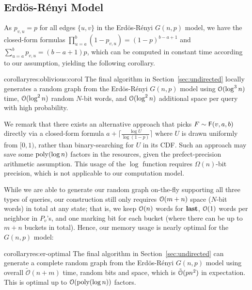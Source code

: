 \subsection{Erd\"{o}s-R\'{e}nyi Model}
\label{sec:app_er}
As $p_{v,u} = p$ for all edges $\{u,v\}$ in the Erd\"{o}s-R\'{e}nyi $G(n,p)$ model, we have the closed-form formulas $\prod_{u=a}^b (1-p_{v,u}) = (1-p)^{b-a+1}$ and $\sum_{u=a}^b p_{v,u} = (b-a+1)p$, which can be computed in constant time according to our assumption, yielding the following corollary.
\begin{restatable}{corollary}{res:oblivious:corol}
The final algorithm in Section~\ref{sec:undirected} locally generates a random graph from the Erd\"{o}s-R\'{e}nyi $G(n,p)$ model using $\mathcal{O}(\log^3 n)$ time, $\mathcal{O}(\log^2 n)$ random $N$-bit words, and $\mathcal{O}(\log^2 n)$ additional space per query with high probability.
\end{restatable}

We remark that there exists an alternative approach that picks $F\sim\mathsf{F}(v,a,b)$ directly via a closed-form formula $a+\lceil\frac{\log U}{\log (1-p)}\rceil$ where $U$ is drawn uniformly from $[0,1)$, rather than binary-searching for $U$ in its CDF. Such an approach may save some $\mathrm{poly}(\log n)$ factors in the resources, given the prefect-precision arithmetic assumption. This usage of the $\log$ function requires $\Omega(n)$-bit precision, which is not applicable to our computation model.

While we are able to generate our random graph on-the-fly supporting all three types of queries, our construction still only requires $\mathcal{O}(m+n)$ space ($N$-bit words) in total at any state; that is, we keep $\mathcal{O}(n)$ words for $\mathbf{last}$, $\mathcal{O}(1)$ words per neighbor in $P_v$'s, and one marking bit for each bucket (where there can be up to $m+n$ buckets in total). Hence, our memory usage is nearly optimal for the $G(n,p)$ model:

\begin{restatable}{corollary}{res:er-optimal}
\label{thm:er-optimal}
The final algorithm in Section~\ref{sec:undirected} can generate a complete random graph
from the Erd\"{o}s-R\'{e}nyi $G(n,p)$ model using overall
$\tilde{\mathcal{O}}(n+m)$ time, random bits and space, which is $\tilde{\mathcal{O}}(pn^2)$ in expectation.
This is optimal up to $ \mathcal{O}(\mathrm{poly}(\log n))$ factors.
\end{restatable}

\iffalse
The deterministic version (Section~\ref{sec:ER-det}) does not require the extra overhead resulting from failed iterations.
However, the two level data-structure introduces an extra $\Bo(\log n)$ factor, resulting in the same overall running time.
However, this only requires one $N$-bit random word.
\fi





